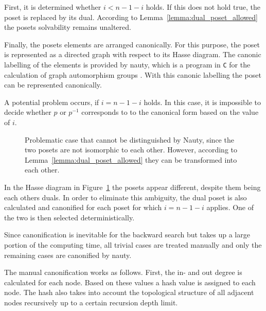 \documentclass[10pt,journal,compsoc]{IEEEtran}
\begin{document}
First, it is determined whether $i < n - 1 - i$ holds.
If this does not hold true, the poset is replaced by its dual.
According to Lemma~\ref{lemma:dual_poset_allowed} the posets solvability remains unaltered.

Finally, the posets elements are arranged canonically.
For this purpose, the poset is represented as a directed graph with respect to its Hasse diagram.
The canonic labelling of the elements is provided by nauty, which is a program in \texttt{C} for the calculation of graph automorphism groups \cite[Practical Graph Isomorphism]{MCKAY201494}.
With this canonic labelling the poset can be represented canonically.

A potential problem occurs, if $i = n - 1 - i$ holds.
In this case, it is impossible to decide whether $p$ or $p^{-1}$ corresponds to to the canonical form based on the value of $i$.

\begin{figure}[!b]
  \centering
  
  \caption{Problematic case that cannot be distinguished by Nauty, since the two posets are not isomorphic to each other. However, according to Lemma~\ref{lemma:dual_poset_allowed} they can be transformed into each other.}
  \label{fig:backward_canonify_problematic}
\end{figure}

In the Hasse diagram in Figure~\ref{fig:backward_canonify_problematic} the posets appear different, despite them being each others duals.
In order to eliminate this ambiguity, the dual poset is also calculated and canonified for each poset for which $i = n - 1 - i$ applies.
One of the two is then selected deterministically.

Since canonification is inevitable for the backward search but takes up a large portion of the computing time, all trivial cases are treated manually and only the remaining cases are canonified by nauty.

The manual canonification works as follows.
First, the in- and out degree is calculated for each node.
Based on these values a hash value is assigned to each node.
The hash also takes into account the topological structure of all adjacent nodes recursively up to a certain recursion depth limit.
\end{document}
